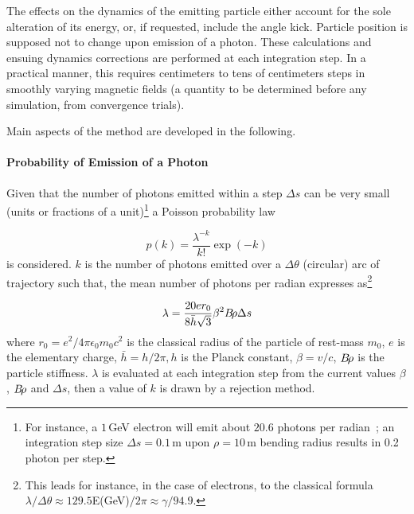 \noindent The effects on the dynamics of the emitting particle 
 either account for the sole  alteration of its  energy, or, if requested, include the angle kick.
Particle position is supposed not to  change upon emission of a photon. These calculations 
 and ensuing dynamics corrections are performed at 
 each integration step. In a practical manner, this requires 
 centimeters  to tens of centimeters steps in smoothly varying magnetic fields (a quantity to 
be determined before any simulation, from convergence trials). 

\medskip 


\noindent Main aspects of the method are developed in the following. 



\paragraph{Probability of Emission of a Photon}

Given that the number of photons emitted within a step $\Delta s$ can be very small  (units or fractions 
of a unit)\footnote{For instance, a $1\,$GeV electron will emit about $20.6$ photons per radian~; an 
 integration step size $\Delta s =0.1\,$m upon $\rho=10\,$m bending radius results in 0.2 photon  
per step.} a Poisson probability law 

\begin{equation}
	\label{EqPoiss}
 p(k) = \dfrac{\lambda^{-k}}{k!} \exp(-k)
\end{equation}
%
is considered. $k$ is the number of photons emitted over a $\Delta \theta$ (circular) arc of 
trajectory  such that, the mean number of photons per radian expresses as\footnote{This leads for 
instance, in the case of electrons, to the classical formula $\lambda/\Delta \theta \approx
129.5$E(GeV)$/2\pi\approx \gamma/94.9$.}

\begin{equation}
        \label{EqPoissMean}
 \lambda = \dfrac{20 e r_0 }{8 \bar{h} \sqrt{3}  } \beta^2 B\!\rho  \Delta s
\end{equation}
%
where $r_0=e^2/4\pi \epsilon_0 m_0 c^2$ is the classical radius of the particle of rest-mass $m_0$, 
$e$ is the elementary 
charge, $\bar{h} = h/2\pi , h$ is the Planck constant, $\beta = v/c$, $B\!\rho$ is the particle 
stiffness. $\lambda$ is evaluated at each integration step from the current values $\beta$, $B\!\rho$ 
and $\Delta s$,  then a value of $k$ is drawn by a rejection method.  


